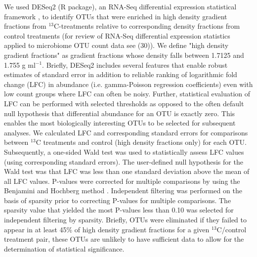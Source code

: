 We used DESeq2 (R package), an RNA-Seq differential expression statistical
framework \citep{love2014}, to identify OTUs that were enriched in high
density gradient fractions from $^{13}$C-treatments relative to corresponding
density fractions from control treatments (for review of RNA-Seq differential
expression statistics applied to microbiome OTU count data see (30)). We define
"high density gradient fractions" as gradient fractions whose density falls
between 1.7125 and 1.755 g ml$^{-1}$. Briefly, DESeq2 includes several features that
enable robust estimates of standard error in addition to reliable ranking of
logarithmic fold change (LFC) in abundance (i.e. gamma-Poisson regression
coefficients) even with low count groups where LFC can often be noisy.
Further, statistical evaluation of LFC can be performed with selected
thresholds as opposed to the often default null hypothesis that differential
abundance for an OTU is exactly zero. This enables the most biologically
interesting OTUs to be selected for subsequent analyses. We calculated LFC
and corresponding standard errors for comparisons between $^{13}$C
treatments and control (high density fractions only) for each OTU.
Subsequently, a one-sided Wald test was used to statistically assess LFC
values (using corresponding standard errors). The user-defined null
hypothesis for the Wald test was that LFC was less than one standard
deviation above the mean of all LFC values. P-values were corrected for
multiple comparisons by using the Benjamini and Hochberg method
\citep{benjamini1995}. Independent filtering was performed on the basis of
sparsity prior to correcting P-values for multiple comparisons. The
sparsity value that yielded the most P-values less than 0.10 was selected
for independent filtering by sparsity. Briefly, OTUs were eliminated if
they failed to appear in at least 45\% of high density gradient fractions
for a given $^{13}$C/control treatment pair, these OTUs are unlikely to
have sufficient data to allow for the determination of statistical
significance.
